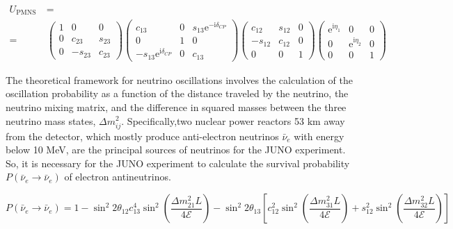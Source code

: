 \begin{equation*} 
	\begin{split}
			U_{\text {PMNS }}&=\\
		=&\left(\begin{array}{ccc}
			1 & 0 & 0 \\
			0 & c_{23} & s_{23} \\
			0 & -s_{23} & c_{23}
		\end{array}\right) \left(\begin{array}{ccc}
			c_{13} & 0 & s_{13} \mathrm{e}^{-\mathrm{i} \delta_{C P}} \\
			0 & 1 & 0 \\
			-s_{13} \mathrm{e}^{\mathrm{i} \delta_{C P}} & 0 & c_{13}
		\end{array}\right) 
		\left(\begin{array}{ccc}
			c_{12} & s_{12} & 0 \\
			-s_{12} & c_{12} & 0 \\
			0 & 0 & 1
		\end{array}\right)\left(\begin{array}{ccc}
			\mathrm{e}^{\mathrm{i} \eta_1} & 0 & 0 \\
			0 & \mathrm{e}^{\mathrm{i} \eta_2} & 0 \\
			0 & 0 & 1
		\end{array}\right)
	\end{split}
\end{equation*}

The theoretical framework for neutrino oscillations involves the calculation of the oscillation probability as a function of the distance traveled by the neutrino, the neutrino mixing matrix, and the difference in squared masses between the three neutrino mass states, $\Delta m_{ij}^2$. Specifically,two nuclear power reactors 53 $\unit{\kilo\meter}$ away from the detector, which mostly produce anti-electron neutrinos $\bar{\nu}_e$ with energy below 10 MeV, are the principal sources of neutrinos for the JUNO experiment. So, it is necessary for the JUNO experiment to calculate the survival probability $P\left(\bar{\nu}_e \rightarrow \bar{\nu}_e\right)$ of electron antineutrinos.

\begin{equation*}
	P\left(\bar{\nu}_e \rightarrow \bar{\nu}_e\right)=1-\sin ^2 2 \theta_{12} c_{13}^4 \sin ^2\left(\frac{\Delta m_{21}^2 L}{4 \mathcal{E}}\right)-\sin ^2 2 \theta_{13}\left[c_{12}^2 \sin ^2\left(\frac{\Delta m_{31}^2 L}{4 \mathcal{E}}\right)+s_{12}^2 \sin ^2\left(\frac{\Delta m_{32}^2 L}{4 \mathcal{E}}\right)\right]
\end{equation*}


